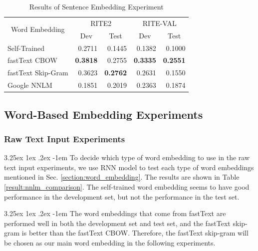\documentclass[12pt]{article}
\makeatletter
\renewcommand\paragraph{\@startsection{paragraph}{5}{\z@}%
  {3.25ex \@plus1ex \@minus.2ex}%
  {-1em}%
  {\normalfont\normalsize\bfseries}}
\makeatother
\begin{document}
\begin{CJK*}{UTF8}{bkai}
\begin{spacing}{1.77}
\begin{table}[H]
  \centering
  \setlength{\extrarowheight}{-3pt}
  \caption{Results of Sentence Embedding Experiment}
  \label{result:sent_emb_nnlm}
  \begin{tabular}{|l|r|r|r|r|}
  \hline
  \multicolumn{1}{|c|}{\multirow{2}{*}{Word Embedding}} & \multicolumn{2}{c|}{RITE2} & \multicolumn{2}{c|}{RITE-VAL} \\ \cline{2-5}
  \multicolumn{1}{|c|}{} & \multicolumn{1}{c|}{Dev} & \multicolumn{1}{c|}{Test} & \multicolumn{1}{c|}{Dev} & \multicolumn{1}{c|}{Test} \\ \hline
  Self-Trained & 0.2711 & 0.1445 & 0.1382 & 0.1000 \\ \hline
  fastText CBOW & \textbf{0.3818} & 0.2755 & \textbf{0.3335} & \textbf{0.2551} \\ \hline
  fastText Skip-Gram & 0.3623 & \textbf{0.2762} & 0.2631 & 0.1550 \\ \hline
  Google NNLM & 0.1851 & 0.2019 & 0.2363 & 0.1874 \\ \hline
  \end{tabular}
\end{table}

\subsection{Word-Based Embedding Experiments}
\subsubsection{Raw Text Input Experiments}
\paragraph{}
To decide which type of word embedding to use in the raw text input experiments, we use RNN model to test each type of word embeddings mentioned in Sec. \ref{section:word_embedding}. The results are shown in Table \ref{result:nnlm_comparison}. The self-trained word embedding seems to have good performance in the development set, but not the performance in the test set.

\paragraph{}
The word embeddings that come from fastText are performed well in both the development set and test set, and the fastText skip-gram is better than the fastText CBOW. Therefore, the fastText skip-gram will be chosen as our main word embedding in the following experiments.


\end{spacing}
\end{CJK*}
\end{document}
